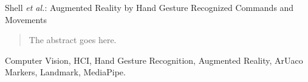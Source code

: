 \documentclass[journal]{IEEEtran}
\begin{document}
%
{Shell \MakeLowercase{\textit{et al.}}: Augmented Reality by Hand Gesture Recognized Commands and Movements}
% 











\maketitle

\begin{abstract}
The abstract goes here.
\end{abstract}

\begin{IEEEkeywords}
Computer Vision, HCI, Hand Gesture Recognition, Augmented Reality, ArUaco Markers, Landmark, MediaPipe.
\end{IEEEkeywords}






%
\IEEEpeerreviewmaketitle
\end{document}
